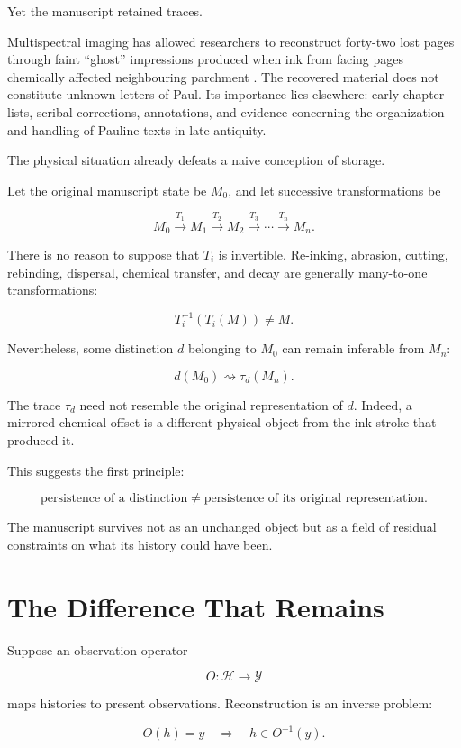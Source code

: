 \documentclass[11pt]{article}
\begin{document}
Yet the manuscript retained traces.

Multispectral imaging has allowed researchers to reconstruct forty-two lost pages through faint ``ghost'' impressions produced when ink from facing pages chemically affected neighbouring parchment \cite{allenfowler2025codexh}. The recovered material does not constitute unknown letters of Paul. Its importance lies elsewhere: early chapter lists, scribal corrections, annotations, and evidence concerning the organization and handling of Pauline texts in late antiquity.

The physical situation already defeats a naive conception of storage.

Let the original manuscript state be $M_0$, and let successive transformations be

\[ M_0 \xrightarrow{T_1} M_1 \xrightarrow{T_2} M_2 \xrightarrow{T_3} \cdots \xrightarrow{T_n} M_n.\]

There is no reason to suppose that $T_i$ is invertible. Re-inking, abrasion, cutting, rebinding, dispersal, chemical transfer, and decay are generally many-to-one transformations:

\[ T_i^{-1}(T_i(M)) \neq M.\]

Nevertheless, some distinction $d$ belonging to $M_0$ can remain inferable from $M_n$:

\[ d(M_0) \rightsquigarrow \tau_d(M_n).\]

The trace $\tau_d$ need not resemble the original representation of $d$. Indeed, a mirrored chemical offset is a different physical object from the ink stroke that produced it.

This suggests the first principle:

\[ \boxed{ \text{persistence of a distinction} \neq \text{persistence of its original representation}. }\]

The manuscript survives not as an unchanged object but as a field of residual constraints on what its history could have been.

\section{The Difference That Remains}

Suppose an observation operator

\[ O : \mathcal H \rightarrow \mathcal Y\]

maps histories to present observations. Reconstruction is an inverse problem:

\[ O(h)=y \quad\Longrightarrow\quad h\in O^{-1}(y).\]
\end{document}
